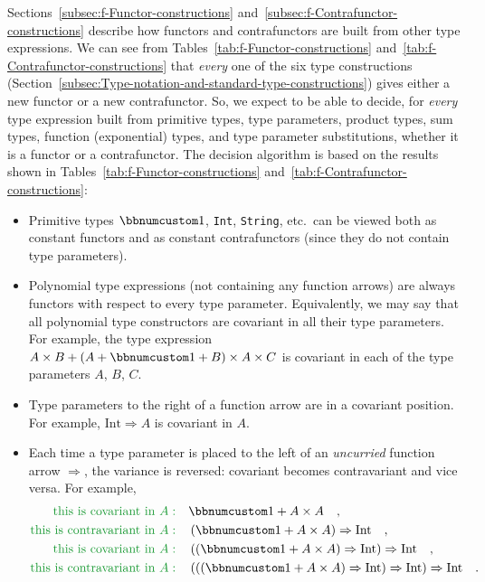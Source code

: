 Sections~\ref{subsec:f-Functor-constructions} and~\ref{subsec:f-Contrafunctor-constructions}
describe how functors and contrafunctors are built from other type
expressions. We can see from Tables~\ref{tab:f-Functor-constructions}
and~\ref{tab:f-Contrafunctor-constructions} that \emph{every} one
of the six type constructions (Section~\ref{subsec:Type-notation-and-standard-type-constructions})
gives either a new functor or a new contrafunctor. So, we expect to
be able to decide, for \emph{every} type expression built from primitive
types, type parameters, product types, sum types, function (exponential)
types, and type parameter substitutions, whether it is a functor or
a contrafunctor. The decision algorithm is based on the results shown
in Tables~\ref{tab:f-Functor-constructions} and~\ref{tab:f-Contrafunctor-constructions}:
\begin{itemize}
\item Primitive types $\bbnum 1$, \lstinline!Int!, \lstinline!String!,
etc.~can be viewed both as constant functors and as constant contrafunctors
(since they do not contain type parameters).
\item Polynomial type expressions (not containing any function arrows) are
always functors with respect to every type
parameter. Equivalently, we may say that all polynomial type constructors
are covariant in all their type parameters. For example, the type
expression $A\times B+\left(A+\bbnum 1+B\right)\times A\times C$
is covariant in each of the type parameters $A$, $B$, $C$.
\item Type parameters to the right of a function arrow are in a covariant
position. For example, $\text{Int}\Rightarrow A$ is covariant in
$A$.
\item Each time a type parameter is placed to the left of an \emph{uncurried}
function arrow $\Rightarrow$, the variance is reversed: covariant
becomes contravariant and vice versa. For example,
\begin{align*}
{\color{greenunder}\text{this is covariant in }A:}\quad & \bbnum 1+A\times A\quad,\\
{\color{greenunder}\text{this is contravariant in }A:}\quad & \left(\bbnum 1+A\times A\right)\Rightarrow\text{Int}\quad,\\
{\color{greenunder}\text{this is covariant in }A:}\quad & \left(\left(\bbnum 1+A\times A\right)\Rightarrow\text{Int}\right)\Rightarrow\text{Int}\quad,\\
{\color{greenunder}\text{this is contravariant in }A:}\quad & \left(\left(\left(\bbnum 1+A\times A\right)\Rightarrow\text{Int}\right)\Rightarrow\text{Int}\right)\Rightarrow\text{Int}\quad.

\end{align*}
\end{itemize}
